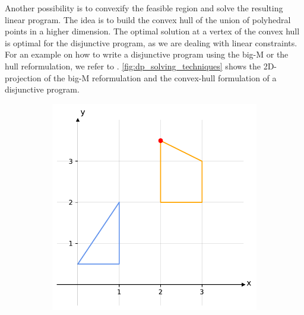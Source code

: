 Another possibility is to convexify the feasible region and solve the resulting linear program. The idea is to build the convex hull of the union of polyhedral points in a higher dimension.  The optimal solution at a vertex of the convex hull is optimal for the disjunctive program, as we are dealing with linear constraints. %
For an example on how to write a disjunctive program using the big-M or the hull reformulation, we refer to \cite{perez_disjunctiveprogrammingjl_2023}.
\cref{fig:dp_solving_techniques} shows the 2D-projection of the big-M reformulation and the convex-hull formulation of a disjunctive program. 

\begin{figure}[H]
    \centering
    \caption{DP reformulations}
    \label{fig:dp_solving_techniques}
    \begin{subfigure}{0.33\textwidth}
    \centering
        \includegraphics[width=0.95\linewidth]{Images/dp.pdf}
        \caption{}
    \end{subfigure}%
    \begin{subfigure}{0.33\textwidth}
    \centering

\end{subfigure}
\end{figure}
